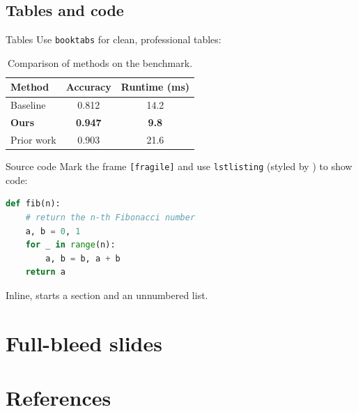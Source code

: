 \documentclass[aspectratio=169,onlytextwidth]{beamer}
\begin{document}
\subsection{Tables and code}

\begin{frame}{Tables}
  Use \texttt{booktabs} for clean, professional tables:

  \begin{table}
    \centering
    \begin{tabular}{lcc}
      \toprule
      Method & Accuracy & Runtime (ms) \\
      \midrule
      Baseline      & 0.812 & 14.2 \\
      \textbf{Ours} & \textbf{0.947} & \textbf{9.8} \\
      Prior work    & 0.903 & 21.6 \\
      \bottomrule
    \end{tabular}
    \caption{Comparison of methods on the benchmark.}
  \end{table}
\end{frame}

\begin{frame}[fragile]{Source code}
  Mark the frame \texttt{[fragile]} and use \texttt{lstlisting} (styled by
  ) to show code:

\begin{lstlisting}[language=Python]
def fib(n):
    # return the n-th Fibonacci number
    a, b = 0, 1
    for _ in range(n):
        a, b = b, a + b
    return a
\end{lstlisting}

  Inline,  starts a section and  an unnumbered list.
\end{frame}


\section{Full-bleed slides}

\begin{frame}[t]
\end{frame}

\begin{frame}
  \vskip0.4cm
\end{frame}


\section{References}
\end{document}
